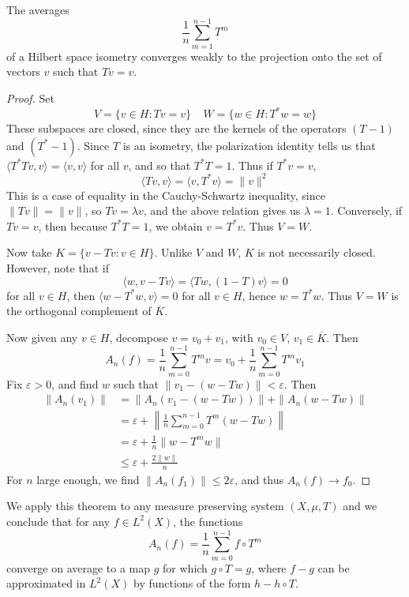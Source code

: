 \begin{theorem}
    The averages
    \[ \frac{1}{n} \sum_{m = 1}^{n-1} T^m \]
    of a Hilbert space isometry converges weakly to the projection onto the set of vectors $v$ such that $Tv = v$.
\end{theorem}
\begin{proof}
    Set
    \[ V = \{ v \in H : Tv = v \}\ \ \ \ \ W = \{ w \in H : T^*w = w \} \]
    These subspaces are closed, since they are the kernels of the operators $(T - 1)$ and $(T^* - 1)$. Since $T$ is an isometry, the polarization identity tells us that $\langle T^*T v, v \rangle = \langle v, v \rangle$ for all $v$, and so that $T^*T = 1$. Thus if $T^*v = v$,
    \[ \langle Tv, v \rangle = \langle v, T^*v \rangle = \| v \|^2 \]
    This is a case of equality in the Cauchy-Schwartz inequality, since $\|Tv\| = \|v\|$, so $Tv = \lambda v$, and the above relation gives us $\lambda = 1$. Conversely, if $Tv = v$, then because $T^*T = 1$, we obtain $v = T^*v$. Thus $V = W$.

    Now take $K = \{ v - Tv : v \in H \}$. Unlike $V$ and $W$, $K$ is not necessarily closed. However, note that if
    \[ \langle w, v - Tv \rangle = \langle Tw, (1-T)v \rangle = 0 \]
    for all $v \in H$, then $\langle w - T^*w, v \rangle = 0$ for all $v \in H$, hence $w = T^*w$. Thus $V = W$ is the orthogonal complement of $\overline{K}$.

    Now given any $v \in H$, decompose $v = v_0 + v_1$, with $v_0 \in V$, $v_1 \in \overline{K}$. Then
    \[ A_n(f) = \frac{1}{n} \sum_{m = 0}^{n-1} T^m v = v_0 + \frac{1}{n} \sum_{m = 0}^{n-1} T^m v_1 \]
    Fix $\varepsilon > 0$, and find $w$ such that $\| v_1 - (w - Tw) \| < \varepsilon$. Then
    \begin{align*}
        \|A_n(v_1)\| &= \|A_n(v_1 - (w - Tw))\| + \| A_n(w - Tw) \|\\
        &= \varepsilon + \left\| \frac{1}{n} \sum_{m = 0}^{n-1} T^m (w - Tw) \right\|\\
        &= \varepsilon + \frac{1}{n} \| w - T^m w \|\\
        &\leq \varepsilon + \frac{2 \|w\|}{n}
    \end{align*}
    For $n$ large enough, we find $\| A_n(f_1) \| \leq 2 \varepsilon$, and thus $A_n(f) \to f_0$.
\end{proof}

We apply this theorem to any measure preserving system $(X,\mu,T)$ and we conclude that for any $f \in L^2(X)$, the functions
%
\[ A_n(f) = \frac{1}{n} \sum_{m = 0}^{n-1} f \circ T^m \]
%
converge on average to a map $g$ for which $g \circ T = g$, where $f - g$ can be approximated in $L^2(X)$ by functions of the form $h - h \circ T$.

